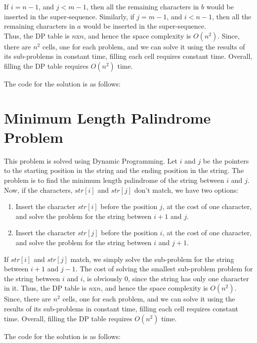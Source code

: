 \documentclass{article}
\begin{document}
If $i = n-1$, and $j < m-1$, then all the remaining characters in $b$ would be inserted in the super-sequence. Similarly, if $j = m-1$, and $i < n-1$, then all the remaining characters in $a$ would be inserted in the super-sequence.
\\
Thus, the DP table is $n$x$n$, and hence the space complexity is $O(n^2)$. Since, there are $n^2$ cells, one for each problem, and we can solve it using the results of its sub-problems in constant time, filling each cell requires constant time. Overall, filling the DP table requires $O(n^2)$ time. 

The code for the solution is as follows:

\clearpage

\section{Minimum Length Palindrome Problem}
This problem is solved using Dynamic Programming. Let $i$ and $j$ be the pointers to the starting position in the string and the ending position in the string. The problem is to find the minimum length palindrome of the string between $i$ and $j$. Now, if the characters, $str[i]$ and $str[j]$ don't match, we have two options:
\begin{enumerate} 
\item Insert the character $str[i]$ before the position $j$, at the cost of one character, and solve the problem for the string between $i+1$ and $j$.
\item Insert the character $str[j]$ before the position $i$, at the cost of one character, and solve the problem for the string between $i$ and $j+1$.
\end{enumerate}
If $str[i]$ and $str[j]$ match, we simply solve the sub-problem for the string between $i+1$ and $j-1$.
The cost of solving the smallest sub-problem problem for the string between $i$ and $i$, is obviously 0, since the string has only one character in it. Thus, the DP table is $n$x$n$, and hence the space complexity is $O(n^2)$. Since, there are $n^2$ cells, one for each problem, and we can solve it using the results of its sub-problems in constant time, filling each cell requires constant time. Overall, filling the DP table requires $O(n^2)$ time. 

The code for the solution is as follows:

\clearpage
\end{document}
